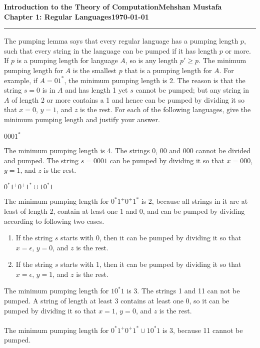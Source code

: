 \documentclass[11pt]{article}
\newcommand{\myname}{Mehshan Mustafa}
\newcommand{\dated}{\today}
\newenvironment{problem}[2][Problem]{\begin{trivlist}
\item[\hskip \labelsep {\bfseries #1}\hskip \labelsep {\bfseries #2.}]}{\end{trivlist}}
\begin{document}
\textbf{Introduction to the Theory of
Computation}\hfill\textbf{\myname}\\[0.01in]
\textbf{Chapter 1: Regular Languages}\hfill\textbf{\dated}\\
\smallskip\hrule\bigskip

\begin{problem}{1.55}
The pumping lemma says that every regular language has a pumping length $p$, such that every string in the language can be pumped if it has length $p$ or more. If $p$ is a pumping length for language $A$, so is any length $p' \geq p$. The minimum pumping length for $A$ is the smallest $p$ that is a pumping length for $A$. For example, if $A = 01^{*}$, the minimum pumping length is 2. The reason is that the string $s = 0$ is in $A$ and has length 1 yet $s$ cannot be pumped; but any string in $A$ of length 2 or more contains a 1 and hence can be pumped by dividing it so that $x = 0$, $y = 1$, and $z$ is the rest. For each of the following languages, give the minimum pumping length and justify your answer.
\end{problem}

\begin{problem}[Part]{a}
$0001^{*}$
\end{problem}
The minimum pumping length is 4. The strings 0, 00 and 000 cannot be divided and pumped. The string $s=0001$ can be pumped by dividing it so that $x=000$, $y=1$, and $z$ is the rest.

\begin{problem}[Part]{d}
$0^{*}1^{+}0^{+}1^{*} \cup 10^{*}1$
\end{problem}
The minimum pumping length for $0^{*}1^{+}0^{+}1^{*}$ is 2, because all strings in it are at least of length 2, contain at least one 1 and 0, and can be pumped by dividing according to following two cases.
\begin{enumerate}
\item If the string $s$ starts with 0, then it can be pumped by dividing it so that $x=\epsilon$, $y=0$, and $z$ is the rest.
\item If the string $s$ starts with 1, then it can be pumped by dividing it so that $x=\epsilon$, $y=1$, and $z$ is the rest.
\end{enumerate}

The minimum pumping length for $10^{*}1$ is 3. The strings 1 and 11 can not be pumped. A string of length at least 3 contains at least one 0, so it can be pumped by dividing it so that $x=1$, $y=0$, and $z$ is the rest.
\\
\\
The minimum pumping length for $0^{*}1^{+}0^{+}1^{*} \cup 10^{*}1$ is 3, because 11 cannot be pumped.
\end{document}
